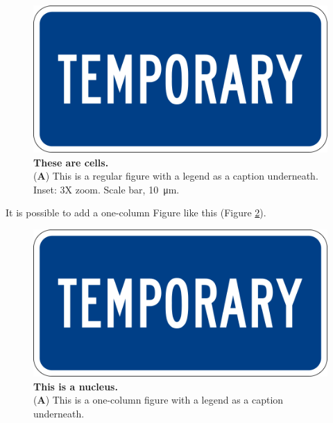 

%

%




\begin{figure}
	\centering
	\includegraphics[width=0.75\linewidth]{Figures/temp.png}
	\caption{\textbf{These are cells.}\\
		(\textbf{A}) This is a regular figure with a legend as a caption underneath. Inset: 3X zoom. Scale bar, \SI{10}{\micro\meter}.}
	\label{fig:cells}
\end{figure}

It is possible to add a one-column Figure like this (Figure \ref{fig:nucleus}).

\begin{figure}
	\centering
	\includegraphics[width=0.75\linewidth]{Figures/temp.png}
	\caption{\textbf{This is a nucleus.}\\
		(\textbf{A}) This is a one-column figure with a legend as a caption underneath.}
	\label{fig:nucleus}
\end{figure}


